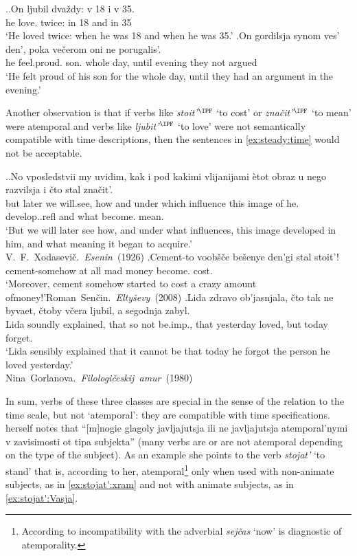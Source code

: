 \ex.\label{ex:steady:adv}\ag.On ljubil dva\v{z}dy: v 18 i v 35.\\
he love. twice: in 18 and in 35\\
\trans `He loved twice: when he was 18 and when he was 35.'
\bg.On gordilsja synom ves' den', poka ve\v{c}erom oni ne porugalis'.\\
he feel.proud. son. whole day, until evening they not argued\\
\trans `He felt proud of his son for the whole day, until they had an argument in the evening.'

Another observation is that if verbs like \textit{stoit'}$^{\IPF}$ `to cost' or \textit{zna\v{c}it'}$^{\IPF}$ `to mean' were atemporal and verbs like \textit{ljubit'$^{\IPF}$} `to love' were not semantically compatible with time descriptions, then the sentences in \ref{ex:steady:time} would not be acceptable.

\ex.\label{ex:steady:time}\ag.No vposledstvii my uvidim, kak i pod kakimi vlijanijami \`{e}tot obraz u nego razvilsja i \v{c}to stal zna\v{c}it'.\\
but later we will.see, how and under which influence this image of he. develop..refl and what become. mean.\\
\trans `But we will later see how, and under what influences, this image developed in him, and what meaning it began to acquire.'\\\hbox{}\hfill\hbox{V. F. Xodasevi\v{c}. \textit{Esenin} (1926)}
\bg.Cement-to voob\v{s}\v{c}e be\v{s}enye den'gi stal stoit'!\\
cement-somehow {at all} mad money become. cost.\\
\trans `Moreover, cement somehow started to cost a crazy amount of\linebreak money!'\hbox{}\hfill\hbox{Roman Sen\v{c}in. \textit{Elty\v{s}evy} (2008)}
\bg.Lida zdravo ob'jasnjala, \v{c}to tak ne byvaet, \v{c}toby v\v{c}era ljubil, a segodnja zabyl.\\
Lida soundly explained, that so not be.imp., that yesterday loved, but today forget.\\
\trans `Lida sensibly explained that it cannot be that today he forgot the person he loved yesterday.'\\\hbox{}\hfill\hbox{Nina Gorlanova. \textit{Filologi\v{c}eskij amur} (1980)}

In sum, verbs of these three classes are special in the sense of the relation to the time scale, but not `atemporal': they are compatible with time specifications. \citet[132]{Paducheva:96} herself notes that ``[m]nogie glagoly javljajutsja ili ne javljajutsja atemporal'nymi v zavisimosti ot tipa subjekta'' (many verbs are or are not atemporal depending on the type of the subject). As an example she points to the verb \textit{stojat'} `to stand' that is, according to her, atemporal\footnote{According to \citet{Paducheva:96} incompatibility with the adverbial \textit{sej\v{c}as} `now' is diagnostic of atemporality.} only when used with non-animate subjects, as in \ref{ex:stojat':xram} and not with animate subjects, as in \ref{ex:stojat':Vasja}.

